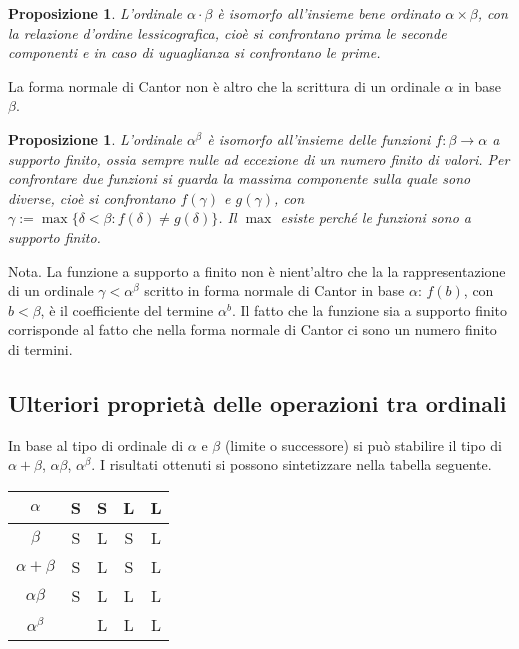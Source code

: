 \documentclass[a4paper,10pt,oneside]{article}
\newcommand{\myname}[1]{\emph{#1}}
\theoremstyle{plain}
\newtheorem{myprop}[mytheorem]{Proposizione}
\theoremstyle{definition}
\theoremstyle{remark}
\begin{document}
\begin{myprop}
 L'ordinale $\alpha \cdot \beta$ è isomorfo all'insieme bene ordinato $\alpha \times \beta$, con la relazione d'ordine \myname{lessicografica}, cioè si confrontano prima le seconde componenti e in caso di uguaglianza si confrontano le prime.
\end{myprop}

La forma normale di Cantor non è altro che la scrittura di un ordinale $\alpha$ in base $\beta$.

\begin{myprop}
 L'ordinale $\alpha^\beta$ è isomorfo all'insieme delle funzioni $f:\beta \rightarrow \alpha$ \emph{a supporto finito}, ossia sempre nulle ad eccezione di un numero finito di valori. Per confrontare due funzioni si guarda la massima componente sulla quale sono diverse, cioè si confrontano $f(\gamma)$ e $g(\gamma)$, con $\gamma := \max\{\delta < \beta: f(\delta)\ne g(\delta)\}$. Il $\max$ esiste perché le funzioni sono a supporto finito.
\end{myprop}

Nota. La funzione a supporto a finito non è nient'altro che la la rappresentazione di un ordinale $\gamma < \alpha^\beta$ scritto in forma normale di Cantor in base $\alpha$: $f(b)$, con $b< \beta$, è il coefficiente del termine $\alpha^b$. Il fatto che la funzione sia a supporto finito corrisponde al fatto che nella forma normale di Cantor ci sono un numero finito di termini.

\subsection{Ulteriori proprietà delle operazioni tra ordinali}

In base al tipo di ordinale di $\alpha$ e $\beta$ (limite o successore) si può stabilire il tipo di $\alpha + \beta$, $\alpha \beta$, $\alpha^\beta$. I risultati ottenuti si possono sintetizzare nella tabella seguente.

\begin{center}
\begin{tabular}{|c||c|c|c|c|}
\hline 
$\alpha$ & S & S & L & L \\
\hline
$\beta$ & S & L & S & L \\
\hline \hline
$\alpha+\beta$ & S & L & S & L \\
\hline 
$\alpha \beta$ & S & L & L & L \\
\hline
$\alpha^\beta$ &   & L & L & L \\
\hline
\end{tabular}
\end{center}
\end{document}
